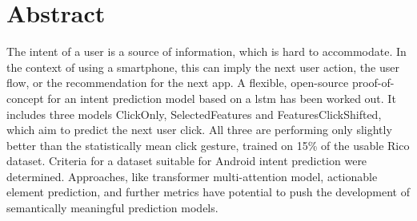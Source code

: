 \section*{Abstract}
\label{sec:abstract}



The intent of a user is a source of information, which is hard to accommodate.
In the context of using a smartphone, this can imply the next user action, the user flow, or the recommendation for the next app.
A flexible, open-source proof-of-concept for an intent prediction model based on a \gls{lstm} has been worked out.
It includes three models ClickOnly, SelectedFeatures and FeaturesClickShifted, which aim to predict the next user click.
All three are performing only slightly better than the statistically mean click gesture, trained on 15\% of the usable Rico dataset.
Criteria for a dataset suitable for Android intent prediction were determined.
Approaches, like transformer multi-attention model, actionable element prediction, and further metrics have potential to push the development of semantically meaningful prediction models.
